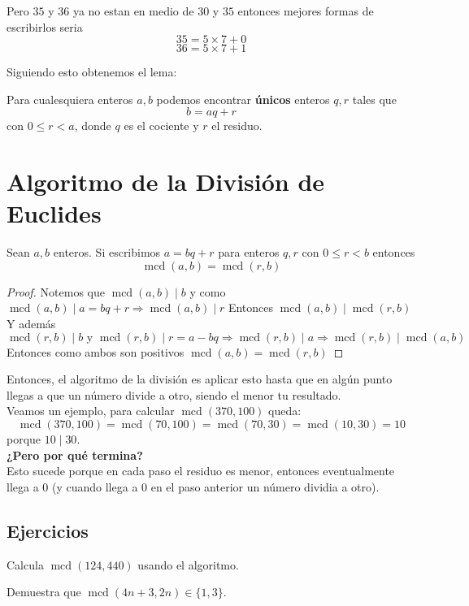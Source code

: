 \documentclass[11pt]{scrartcl}
\newcommand{\mcd}{\operatorname{mcd}}
\begin{document}
Pero $35$ y $36$ ya no estan en medio de $30$ y $35$ entonces mejores formas de escribirlos seria
\[35= 5\times 7+0\]
\[36= 5 \times 7 +1\]

Siguiendo esto obtenemos el lema:
\begin{lemma} 
Para cualesquiera enteros $a,b$ podemos encontrar \textbf{\'unicos} enteros $q,r$ tales que 
\[b = aq+r\]
con $0 \leq r <a$, donde $q$ es el cociente y $r$ el residuo.
\end{lemma}

\section{Algoritmo de la División de Euclides}

\begin{lemma}
Sean $a,b$ enteros. Si escribimos $a=bq+r$ para enteros $q,r$ con $0 \leq r < b$ entonces
\[ \mcd(a,b)=\mcd (r,b) \]
\end{lemma}
\begin{proof}
Notemos que $\mcd(a,b) \mid b$ y como $\mcd(a,b) \mid a = bq+r \Rightarrow \mcd(a,b) \mid r$ Entonces  $\mcd(a,b) \mid \mcd( r,b)$  \\
Y adem\'as 
\[ \mcd(r,b) \mid b \text{ y } \mcd(r,b) \mid r = a-bq \Rightarrow \mcd(r,b) \mid a \Rightarrow \mcd(r,b) \mid \mcd(a,b) \]
Entonces como ambos son positivos $\mcd(a,b)=\mcd(r,b)$
\end{proof}

Entonces, el algoritmo de la divisi\'on es aplicar esto hasta que en alg\'un punto llegas a que un n\'umero divide a otro, siendo el menor tu resultado.  \\
Veamos un ejemplo, para calcular $\mcd(370,100)$ queda:
\[\mcd(370,100)=\mcd(70,100)=\mcd(70,30)=\mcd(10,30)=10\]
porque $10\mid 30$. \\

\textbf{¿Pero por qu\'e termina?} \\

Esto sucede porque en cada paso el residuo es menor, entonces eventualmente llega a 0 (y cuando llega a 0 en el paso anterior un n\'umero dividia a otro).



\subsection{Ejercicios}
\begin{exercise} Calcula $\mcd(124,440)$ usando el algoritmo. \end{exercise}
\begin{exercise} Demuestra que $\mcd(4n+3,2n) \in \{1,3\}$. \end{exercise}
\end{document}
